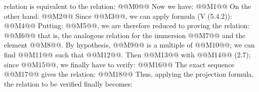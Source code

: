 relation is equivalent to the relation:
@@M0@@
Now we have:
@@M1@@
On the other hand:
@@M2@@
Since @@M3@@, we can apply formula (V (5.4.2)):
@@M4@@
Putting: @@M5@@, we are therefore reduced to proving the relation:
@@M6@@
that is, the analogous relation for the immersion @@M7@@ and the element @@M8@@. By hypothesis, @@M9@@ is a multiple of @@M10@@; we can find @@M11@@ such that @@M12@@. Then @@M13@@ with @@M14@@ (2.7); since @@M15@@, we finally have to verify:
@@M16@@
The exact sequence
@@M17@@
gives the relation:
@@M18@@
Thus, applying the projection formula, the relation to be verified finally becomes:
